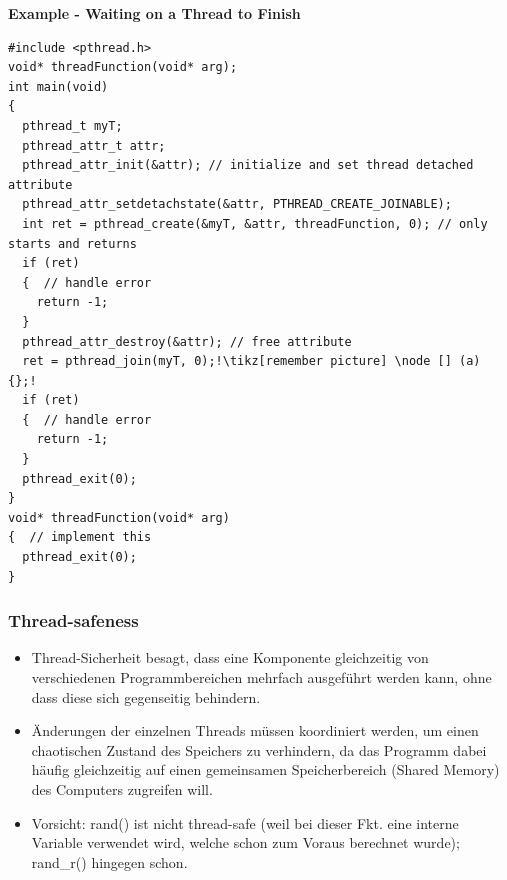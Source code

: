 \textbf{Example - Waiting on a Thread to Finish}
\begin{lstlisting}[style=C, escapechar=!]
#include <pthread.h>
void* threadFunction(void* arg);
int main(void)
{
  pthread_t myT;
  pthread_attr_t attr;
  pthread_attr_init(&attr); // initialize and set thread detached attribute
  pthread_attr_setdetachstate(&attr, PTHREAD_CREATE_JOINABLE);
  int ret = pthread_create(&myT, &attr, threadFunction, 0); // only starts and returns
  if (ret)
  {  // handle error
    return -1;
  }
  pthread_attr_destroy(&attr); // free attribute
  ret = pthread_join(myT, 0);!\tikz[remember picture] \node [] (a) {};!
  if (ret)
  {  // handle error
    return -1;
  }
  pthread_exit(0);
}
void* threadFunction(void* arg)
{  // implement this
  pthread_exit(0);
}
\end{lstlisting}
%

\subsubsection{Thread-safeness}
\begin{itemize}
  \item Thread-Sicherheit besagt, dass eine Komponente gleichzeitig von verschiedenen Programmbereichen mehrfach ausgeführt werden kann, ohne dass diese sich gegenseitig behindern.
  \item Änderungen der einzelnen Threads müssen koordiniert werden, um einen chaotischen Zustand des Speichers zu verhindern, da das Programm dabei häufig gleichzeitig auf einen gemeinsamen Speicherbereich (Shared Memory) des Computers zugreifen will.
  \item Vorsicht: rand() ist nicht thread-safe (weil bei dieser Fkt. eine interne Variable verwendet wird, welche schon zum Voraus berechnet wurde); rand\_r() hingegen schon.
\end{itemize}

